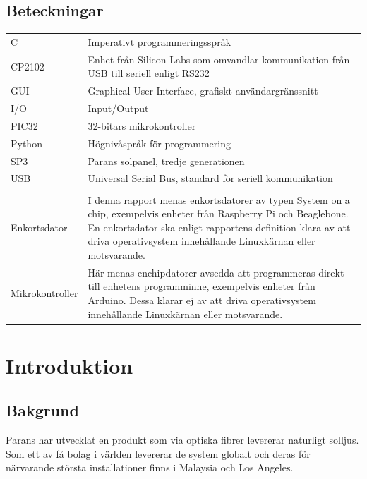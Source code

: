 \documentclass{article}
\begin{document}
    \subsection*{Beteckningar} %
    \label{sub:beteckningar}
        \begin{tabularx}{\textwidth}{@{}lX}
            C & Imperativt programmeringsspråk \\
            CP2102 & Enhet från Silicon Labs som omvandlar kommunikation från
            USB till seriell enligt RS232\\
            GUI & Graphical User Interface, grafiskt användargränssnitt \\
            I/O & Input/Output \\
            PIC32 & 32-bitars mikrokontroller \\
            Python & Högnivåspråk för programmering \\
            SP3 & Parans solpanel, tredje generationen \\
            USB & Universal Serial Bus, standard för seriell kommunikation \\
            \\
            Enkortsdator & I denna rapport menas enkortsdatorer av typen System
            on a chip, exempelvis enheter från Raspberry Pi och Beagle\-bone. 
            En enkortsdator ska enligt rapportens definition klara av att driva 
            operativsystem innehållande Linuxkärnan eller mot\-svarande. \\
            Mikrokontroller & Här menas enchipdatorer avsedda att programmeras 
            direkt till enhetens programminne, exempelvis enheter från 
            \hbox{Arduino}. Dessa klarar ej av att driva operativsystem 
            innehållande Linux\-kärnan eller motsvarande.\\
            

        \end{tabularx}
    \newpage

    \tableofcontents
    \listoffigures

    \newpage

    \section{Introduktion} %
    \label{sec:introduktion}

        \subsection{Bakgrund} %
        \label{sub:bakgrund}
            Parans har utvecklat en produkt som via optiska fibrer levererar naturligt solljus. Som ett av få bolag i världen levererar de system globalt och deras för närvarande största installationer finns i Malaysia och Los Angeles.\\
\end{document}
